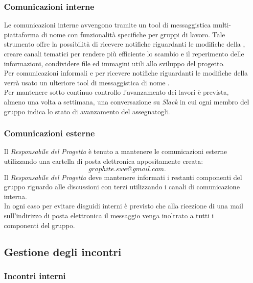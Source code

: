 \documentclass[../NormediProgetto.tex]{subfiles}
\begin{document}
	\subsubsection{Comunicazioni interne}
	
	Le comunicazioni interne avvengono tramite un tool di messaggistica multi-piattaforma di nome  con funzionalità specifiche per gruppi di lavoro. Tale strumento offre la possibilità di ricevere notifiche riguardanti le modifiche della  , creare canali tematici per rendere più efficiente lo scambio e il reperimento delle informazioni, condividere file ed immagini utili allo sviluppo del progetto.
	\\ \noindent Per comunicazioni informali e per ricevere notifiche riguardanti le modifiche della   verrà usato un ulteriore tool di messaggistica di nome .
	\\ \noindent Per mantenere sotto continuo controllo l'avanzamento dei lavori è prevista, almeno una volta a settimana, una conversazione su \textit{Slack} in cui ogni membro del gruppo indica lo stato di avanzamento del  assegnatogli.
	
	\subsubsection{Comunicazioni esterne}
	
	Il \textit{Responsabile del Progetto} è tenuto a mantenere le comunicazioni esterne utilizzando una cartella di posta elettronica appositamente creata:
		\[graphite.swe@gmail.com.\]
	Il \textit{Responsabile del Progetto} deve mantenere informati i restanti componenti del gruppo riguardo alle discussioni con terzi utilizzando i canali di comunicazione interna. 
	\\ \noindent In ogni caso per evitare disguidi interni è previsto che alla ricezione di una mail sull'indirizzo di posta elettronica il messaggio venga inoltrato a tutti i componenti del gruppo.
	
	\subsection{Gestione degli incontri}
	
	\subsubsection{Incontri interni}
	
\end{document}

